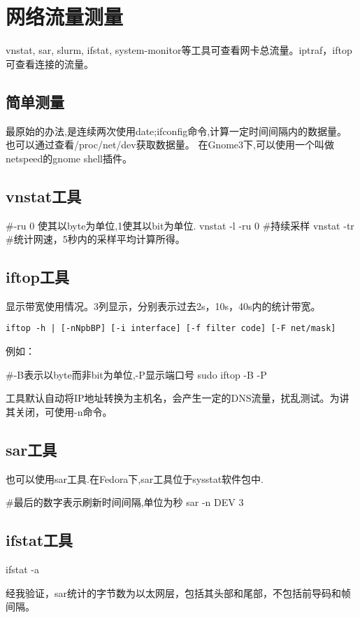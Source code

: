 \section{网络流量测量}
vnstat, sar, slurm, ifstat, system-monitor等工具可查看网卡总流量。iptraf，iftop可查看连接的流量。

\subsection{简单测量}
最原始的办法,是连续两次使用date;ifconfig命令,计算一定时间间隔内的数据量。
也可以通过查看/proc/net/dev获取数据量。
在Gnome3下,可以使用一个叫做netspeed的gnome shell插件。

\subsection{vnstat工具}
\begin{shellcmd}
#-ru 0 使其以byte为单位,1使其以bit为单位.
vnstat -l -ru 0 #持续采样 
vnstat -tr #统计网速，5秒内的采样平均计算所得。
\end{shellcmd}

\subsection{iftop工具}
显示带宽使用情况。3列显示，分别表示过去2s，10s，40s内的统计带宽。
\begin{verbatim}
iftop -h | [-nNpbBP] [-i interface] [-f filter code] [-F net/mask]
\end{verbatim}
例如：
\begin{shellcmd}
#-B表示以byte而非bit为单位,-P显示端口号
sudo iftop -B -P 
\end{shellcmd}
工具默认自动将IP地址转换为主机名，会产生一定的DNS流量，扰乱测试。为讲其关闭，可使用-n命令。

\subsection{sar工具}
也可以使用sar工具.在Fedora下,sar工具位于sysstat软件包中.
\begin{shellcmd}
#最后的数字表示刷新时间间隔,单位为秒
sar -n DEV 3 
\end{shellcmd}

\subsection{ifstat工具}
\begin{shellcmd}
ifstat -a
\end{shellcmd}
经我验证，sar统计的字节数为以太网层，包括其头部和尾部，不包括前导码和帧间隔。


